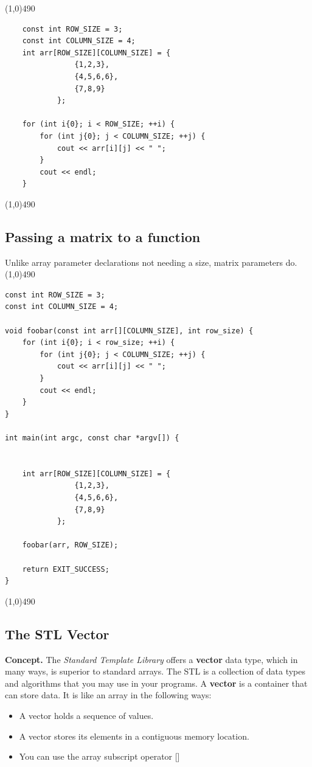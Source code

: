 \documentclass{report}
\begin{document}
    \hspace{0.2in} 
    \begin{minipage}[t]{0.47\textwidth}
\bigbreak \noindent 
\line(1,0){490}
\begin{verbatim}
    const int ROW_SIZE = 3;
    const int COLUMN_SIZE = 4;
    int arr[ROW_SIZE][COLUMN_SIZE] = {
                {1,2,3},
                {4,5,6,6},
                {7,8,9}
            };

    for (int i{0}; i < ROW_SIZE; ++i) {
        for (int j{0}; j < COLUMN_SIZE; ++j) {
            cout << arr[i][j] << " ";
        } 
        cout << endl;
    }
\end{verbatim}
\line(1,0){490}
    
    \end{minipage}

    \pagebreak \bigbreak \noindent 
    \subsection{Passing a matrix to a function}
    \bigbreak \noindent 
    Unlike array parameter declarations not needing a size, matrix parameters do.
    \bigbreak \noindent 
    \line(1,0){490}
    \begin{verbatim}
const int ROW_SIZE = 3;
const int COLUMN_SIZE = 4;

void foobar(const int arr[][COLUMN_SIZE], int row_size) {
    for (int i{0}; i < row_size; ++i) {
        for (int j{0}; j < COLUMN_SIZE; ++j) {
            cout << arr[i][j] << " ";
        }
        cout << endl;
    }
}

int main(int argc, const char *argv[]) {


    int arr[ROW_SIZE][COLUMN_SIZE] = {
                {1,2,3},
                {4,5,6,6},
                {7,8,9}
            };

    foobar(arr, ROW_SIZE);

    return EXIT_SUCCESS;
}
    \end{verbatim}
    \line(1,0){490}

    \pagebreak \bigbreak \noindent 
    \subsection{The STL Vector}
    \bigbreak \noindent 
    \textbf{Concept. } The \textit{Standard Template Library} offers a \textbf{vector} data type, which in many ways, is superior to standard arrays.
    \bigbreak \noindent 
    The STL is a collection of data types and algorithms that you may use in your programs. 
    \bigbreak \noindent 
    A \textbf{vector} is a container that can store data. It is like an array in the following ways:
    \begin{itemize}
        \item A vector holds a sequence of values.
        \item A vector stores its elements in a contiguous memory location.
        \item You can use the array subscript operator []
    \end{itemize}
\end{document}
